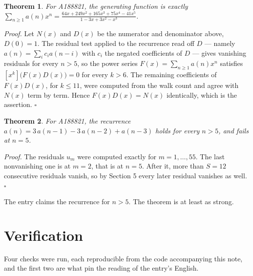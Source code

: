\documentclass[11pt]{article}
\newtheorem{theorem}{Theorem}
\theoremstyle{definition}
\begin{document}
\begin{theorem} For A188821, the generating function is exactly $\sum_{n\ge 1} a(n)x^n = \frac{64x + 249x^{2} + 165x^{3} + 75x^{4} - 41x^{5}}{1 - 3x + 3x^{2} - x^{3}}$.\end{theorem}

{\itshape Proof.} Let $N(x)$ and $D(x)$ be the numerator and denominator above, $D(0)=1$. The residual test applied to the recurrence read off $D$ --- namely $a(n) = \sum_i c_i a(n-i)$ with $c_i$ the negated coefficients of $D$ --- gives vanishing residuals for every $n > 5$, so the power series $F(x)=\sum_{n\ge 1}a(n)x^n$ satisfies $[x^k]\bigl(F(x)D(x)\bigr) = 0$ for every $k > 6$. The remaining coefficients of $F(x)D(x)$, for $k \le 11$, were computed from the walk count and agree with $N(x)$ term by term. Hence $F(x)D(x) = N(x)$ identically, which is the assertion. $\square$

\begin{theorem} For A188821, the recurrence $a(n) = 3\,a(n-1) - 3\,a(n-2) + a(n-3)$ holds for every $n > 5$, and fails at $n = 5$.\end{theorem}

{\itshape Proof.} The residuals $u_m$ were computed exactly for $m = 1,\dots,55$. The last nonvanishing one is at $m = 2$, that is at $n = 5$. After it, more than $S = 12$ consecutive residuals vanish, so by Section 5 every later residual vanishes as well. $\square$

The entry claims the recurrence for $n > 5$. The theorem is at least as strong.

\section{Verification}

Four checks were run, each reproducible from the code accompanying this note, and the first two are what pin the reading of the entry's English.
\end{document}
